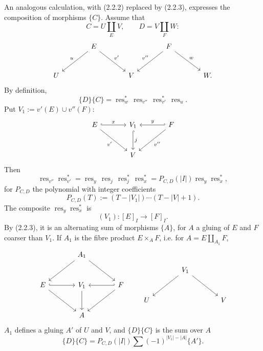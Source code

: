 \documentclass[11pt]{article}
\newcommand{\res}{\operatorname{res}}
\theoremstyle{deligne}
\newcommand{\para}[1]{\vspace{0.65em}\noindent{\bfseries #1}\quad}
\begin{document}
\para{Remark 2.11.}
An analogous calculation, with (2.2.2) replaced by (2.2.3), expresses the composition of morphisms \(\{C\}\). Assume that
\[
  C=U\coprod_E V,\qquad D=V\coprod_F W:
\]
\[
\begin{tikzcd}[column sep=large,row sep=large]
& E \arrow[dl,"u"'] \arrow[dr,"v'"] &&
F \arrow[dl,"v''"'] \arrow[dr,"w"] &\\
U && V && W .
\end{tikzcd}
\]
By definition,
\[
  \{D\}\{C\}=\res_w^*\,\res_{v''}\,\res_{v'}^*\,\res_u.
\]
Put \(V_1:=v'(E)\cup v''(F)\):
\[
\begin{tikzcd}[column sep=large,row sep=large]
E \arrow[r,hook,"x"] \arrow[dr,"v'"'] &
V_1 \arrow[d,hook,"j"] &
F \arrow[l,hook',"y"'] \arrow[dl,"v''"]\\
& V &
\end{tikzcd}
\]
Then
\[
  \res_{v''}\res_{v'}^*
  =
  \res_y\,\res_j\,\res_j^*\,\res_x^*
  =
  P_{C,D}(|I|)\res_y\res_x^*,
\]
for \(P_{C,D}\) the polynomial with integer coefficients
\[
  P_{C,D}(T):=(T-|V_1|)\cdots(T-|V|+1).
  \tag{2.11.1}
\]
The composite \(\res_y\res_x^*\) is
\[
  (V_1):[E]_I\longrightarrow[F]_I.
\]
By (2.2.3), it is an alternating sum of morphisms \(\{A\}\), for \(A\) a gluing of \(E\) and \(F\) coarser than \(V_1\). If \(A_1\) is the fibre product \(E\times_A F\), i.e. for \(A=E\coprod_{A_1}F\),
\[
\begin{tikzcd}[column sep=large,row sep=large]
& A_1 \arrow[dl] \arrow[dr] &\\
E \arrow[r,hook] \arrow[dr] &
V_1 \arrow[d] &
F \arrow[l,hook'] \arrow[dl]\\
& A &
\end{tikzcd}
\qquad
\begin{tikzcd}[column sep=large,row sep=large]
& V_1 \arrow[dl] \arrow[dr] &\\
U && V
\end{tikzcd}
\]
\(A_1\) defines a gluing \(A'\) of \(U\) and \(V\), and \(\{D\}\{C\}\) is the sum over \(A\)
\[
  \{D\}\{C\}
  =
  P_{C,D}(|I|)
  \sum (-1)^{|V_1|-|A|}\{A'\}.
  \tag{2.11.2}
\]
\end{document}

